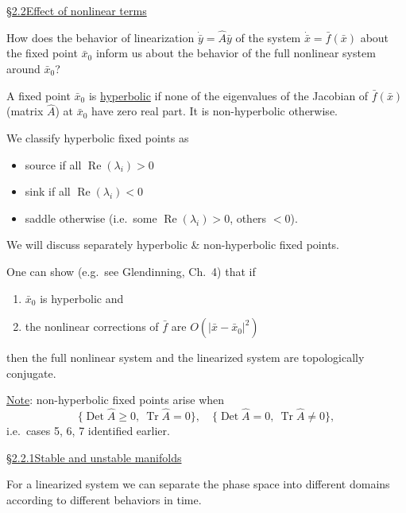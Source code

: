 \newpage
\noindent\underline{\S 2.2\quad Effect of nonlinear terms}

\medskip
\noindent
How does the behavior of linearization $\dot{\bar y}=\hat A\bar y$ of the
system $\dot{\bar x}=\bar f(\bar x)$ about the fixed point $\bar x_0$
inform us about the behavior of the full nonlinear system around $\bar x_0$?

\medskip
\noindent{}

\medskip
\noindent
A fixed point $\bar x_0$ is \underline{hyperbolic} if none of the eigenvalues
of the Jacobian of $\bar f(\bar x)$ (matrix $\hat A$) at $\bar x_0$ have zero
real part. It is non-hyperbolic otherwise.

\medskip
\noindent We classify hyperbolic fixed points as
\begin{itemize}
\setlength{\itemsep}{0pt}
\item[$(\ast)$] source if all $\operatorname{Re}(\lambda_i)>0$
\item[$(\ast)$] sink if all $\operatorname{Re}(\lambda_i)<0$
\item[$(\ast)$] saddle otherwise (i.e.\ some $\operatorname{Re}(\lambda_i)>0$, others $<0$).
\end{itemize}
\noindent
We will discuss separately hyperbolic \& non-hyperbolic fixed points.

\medskip
\noindent One can show (e.g.\ see Glendinning, Ch.\ 4) that if
\begin{enumerate}
\setlength{\itemsep}{0pt}
\item[(1)] $\bar x_0$ is hyperbolic and
\item[(2)] the nonlinear corrections of $\bar f$ are $O(|\bar x-\bar x_0|^2)$
\end{enumerate}
\noindent
then the full nonlinear system and the linearized system are topologically conjugate.

\medskip
\noindent\underline{Note}: non-hyperbolic fixed points arise when
\[
\{\operatorname{Det}\hat A\geq0,\ \operatorname{Tr}\hat A=0\},\quad
\{\operatorname{Det}\hat A=0,\ \operatorname{Tr}\hat A\neq0\},
\]
\noindent i.e.\ cases 5, 6, 7 identified earlier.

\newpage
\noindent\underline{\S 2.2.1\quad Stable and unstable manifolds}

\medskip
\noindent
For a linearized system we can separate the phase space into different domains
according to different behaviors in time.

